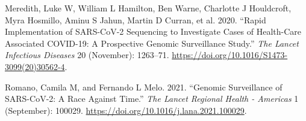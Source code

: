 \documentclass{article}
\newlength{\cslhangindent}
\newlength{\cslentryspacingunit} %
\newenvironment{CSLReferences}[2] %
 {%
  \setlength{\parindent}{0pt}
  \ifodd #1
  \let\oldpar\par
  \def\par{\hangindent=\cslhangindent\oldpar}
  \fi
  \setlength{\parskip}{#2\cslentryspacingunit}
 }%
 {}
\begin{document}
\begin{CSLReferences}{1}{0}
\leavevmode\hypertarget{ref-Meredith2020}{}%
Meredith, Luke W, William L Hamilton, Ben Warne, Charlotte J Houldcroft,
Myra Hosmillo, Aminu S Jahun, Martin D Curran, et al. 2020. {``Rapid
Implementation of SARS-CoV-2 Sequencing to Investigate Cases of
Health-Care Associated COVID-19: A Prospective Genomic Surveillance
Study.''} \emph{The Lancet Infectious Diseases} 20 (November): 1263--71.
\url{https://doi.org/10.1016/S1473-3099(20)30562-4}.

\leavevmode\hypertarget{ref-Romano2021}{}%
Romano, Camila M, and Fernando L Melo. 2021. {``Genomic Surveillance of
SARS-CoV-2: A Race Against Time.''} \emph{The Lancet Regional Health -
Americas} 1 (September): 100029.
\url{https://doi.org/10.1016/j.lana.2021.100029}.

\end{CSLReferences}



\end{document}
